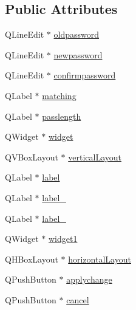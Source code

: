 \subsection*{Public Attributes}
\begin{DoxyCompactItemize}
\item 
Q\-Line\-Edit $\ast$ \hyperlink{classUi__fileaccess_ac0cf382bcd3723ffdb37e061c22efa59}{oldpassword}
\item 
Q\-Line\-Edit $\ast$ \hyperlink{classUi__fileaccess_a3c95b9787b9e1f7c793d1a0b9d40c8bd}{newpassword}
\item 
Q\-Line\-Edit $\ast$ \hyperlink{classUi__fileaccess_a011d5a685955e19f7738172643301453}{confirmpassword}
\item 
Q\-Label $\ast$ \hyperlink{classUi__fileaccess_ac7475623684587202e5d0b8bb33747bf}{matching}
\item 
Q\-Label $\ast$ \hyperlink{classUi__fileaccess_a1aef4018beac84241a85ec99290aac1f}{passlength}
\item 
Q\-Widget $\ast$ \hyperlink{classUi__fileaccess_a05cbbdd1e0f8a2ecee4cb7be6e3716d1}{widget}
\item 
Q\-V\-Box\-Layout $\ast$ \hyperlink{classUi__fileaccess_a3a867523e4669a07d95be16dfe57c358}{vertical\-Layout}
\item 
Q\-Label $\ast$ \hyperlink{classUi__fileaccess_ae6cd96492f2c14d58d422c3fa1405f6a}{label}
\item 
Q\-Label $\ast$ \hyperlink{classUi__fileaccess_a1f9b1845aaa8e7ee51e970cde5e471cc}{label\-\_}
\item 
Q\-Label $\ast$ \hyperlink{classUi__fileaccess_a88a443b94a2b6d3f00ea1bcd7338746b}{label\-\_}
\item 
Q\-Widget $\ast$ \hyperlink{classUi__fileaccess_abdebb9daac6cb94e193aee7fcb44742b}{widget1}
\item 
Q\-H\-Box\-Layout $\ast$ \hyperlink{classUi__fileaccess_a26748e27b324fea9192440863c6fbd89}{horizontal\-Layout}
\item 
Q\-Push\-Button $\ast$ \hyperlink{classUi__fileaccess_aa533d85d0ba01a15b39b916fe7f98f55}{applychange}
\item 
Q\-Push\-Button $\ast$ \hyperlink{classUi__fileaccess_ab5ab6787c441e3d3b74f0a4050c1ccb9}{cancel}
\end{DoxyCompactItemize}


